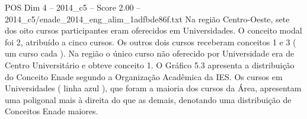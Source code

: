 \begin{textsample}{POS Dim 4 – 2014\_c5 – Score 2.00 – 2014\_c5/enade\_2014\_eng\_alim\_1adfbde86f.txt}
Na região Centro-Oeste, sete dos oito cursos participantes eram oferecidos em Universidades.
O conceito modal foi 2, atribuído a cinco cursos.
Os outros dois cursos receberam conceitos 1 e 3 ( um curso cada ).
Na região o único curso não oferecido por Universidade era de Centro Universitário e obteve conceito 1.
O Gráfico 5.3 apresenta a distribuição do Conceito Enade segundo a Organização Acadêmica da IES.
Os cursos em Universidades ( linha azul ), que foram a maioria dos cursos da Área, apresentam uma poligonal mais à direita do que as demais, denotando uma distribuição de Conceitos Enade maiores.

\end{textsample}
